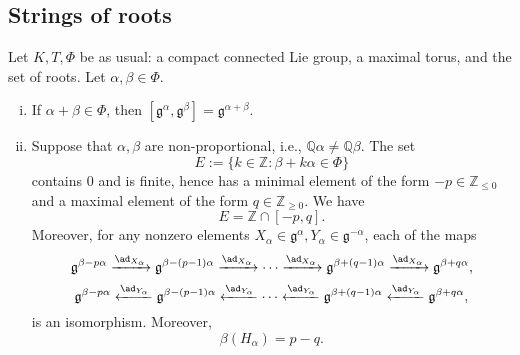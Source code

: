 \documentclass[reqno]{amsart} 
\begin{document}
\subsection{Strings of roots}
Let $K,T,\Phi$ be as usual: a compact connected Lie group, a maximal torus, and the set of roots.  Let $\alpha, \beta \in \Phi$.
\begin{lemma}\label{lem:strings-roots}
  \begin{enumerate}
[(i)]
  \item If $\alpha+\beta \in \Phi$, then $[\mathfrak{g}^\alpha, \mathfrak{g}^{\beta}] = \mathfrak{g}^{\alpha+\beta}$.
  \item Suppose that $\alpha,\beta$ are non-proportional, i.e., $\mathbb{Q} \alpha \neq \mathbb{Q} \beta$.  The set
    \begin{equation*}
      E := \{k \in \mathbb{Z} : \beta + k \alpha \in \Phi \}
    \end{equation*}
    contains $0$ and is finite, hence has a minimal element of the form $-p\in \mathbb{Z}_{ \leq 0}$ and a maximal element of the form $q \in \mathbb{Z}_{\geq 0}$.  We have
    \begin{equation}\label{eq:E-equals-Z-cap-interval}
      E = \mathbb{Z} \cap [-p,q].
    \end{equation}
    Moreover, for any nonzero elements $X_\alpha \in \mathfrak{g}^{\alpha}, Y_\alpha \in \mathfrak{g}^{-\alpha}$, each of the maps
    \begin{equation*}
      \mathfrak{g}^{\beta - p \alpha} \xrightarrow{\ad_{X_\alpha}} \mathfrak{g}^{\beta - (p-1) \alpha} \xrightarrow{\ad_{X_\alpha}} \dotsb \xrightarrow{\ad_{X_\alpha}} \mathfrak{g}^{\beta + (q-1) \alpha} \xrightarrow{\ad_{X_\alpha}} \mathfrak{g}^{\beta + q \alpha},
    \end{equation*}
    \begin{equation*}
      \mathfrak{g}^{\beta - p \alpha} \xleftarrow{\ad_{Y_\alpha}} \mathfrak{g}^{\beta - (p-1) \alpha} \xleftarrow{\ad_{Y_\alpha}} \dotsb \xleftarrow{\ad_{Y_\alpha}} \mathfrak{g}^{\beta + (q-1) \alpha} \xleftarrow{\ad_{Y_\alpha}} \mathfrak{g}^{\beta + q \alpha},
    \end{equation*}
    is an isomorphism.  Moreover,
    \begin{equation}\label{eq:beta-H-alpha-diff-p-q}
      \beta(H_\alpha) = p - q.
    \end{equation}
  \end{enumerate}
\end{lemma}
\end{document}
